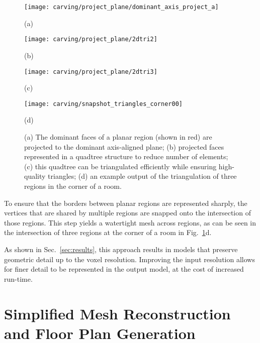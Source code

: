 \documentclass[10pt,twocolumn,twoside]{IEEEtran}
\begin{document}
\begin{figure}[t]

	\begin{minipage}[b]{0.48\linewidth}
		\centerline{\texttt{[image: carving/project\_plane/dominant\_axis\_project\_a]}}
		\centerline{(a)}\medskip
	\end{minipage}
	\hfill
	\begin{minipage}[b]{0.48\linewidth}
		\centerline{\texttt{[image: carving/project\_plane/2dtri2]}}
		\centerline{(b)}\medskip
	\end{minipage}
	
	\begin{minipage}[b]{0.48\linewidth}
		\centerline{\texttt{[image: carving/project\_plane/2dtri3]}}
		\centerline{(c)}\medskip
	\end{minipage}
	\hfill
	\begin{minipage}[b]{0.48\linewidth}
		\centerline{\texttt{[image: carving/snapshot\_triangles\_corner00]}}
		\centerline{(d)}\medskip
	\end{minipage}

	\caption{(a) The dominant faces of a planar region (shown in red) are projected to the dominant axis-aligned plane; (b) projected faces represented in a quadtree structure to reduce number of elements; (c) this quadtree can be triangulated efficiently while ensuring high-quality triangles; (d) an example output of the triangulation of three regions in the corner of a room.}
	\label{fig:triangulation}

\end{figure}

To ensure that the borders between planar regions are represented sharply, the vertices that are shared by multiple regions are snapped onto the intersection of those regions.  This step yields a watertight mesh across regions, as can be seen in the intersection of three regions at the corner of a room in Fig.~\ref{fig:triangulation}d.

As shown in Sec.~\ref{sec:results}, this approach results in models that preserve geometric detail up to the voxel resolution.  Improving the input resolution allows for finer detail to be represented in the output model, at the cost of increased run-time.

\section{Simplified Mesh Reconstruction and Floor Plan Generation}
\label{sec:floorplan}
\end{document}

